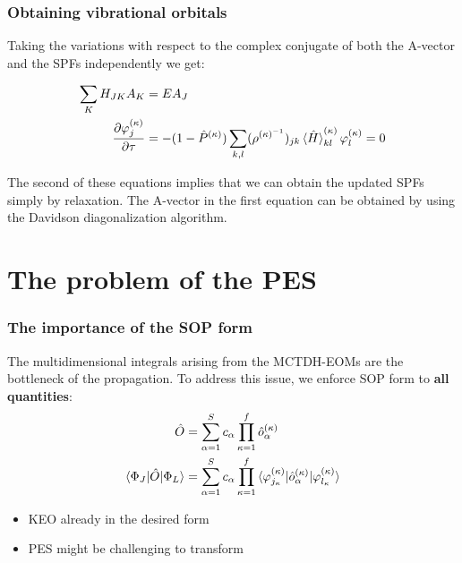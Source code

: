 \documentclass{beamer}
\begin{document}
\begin{frame}
  \frametitle{Obtaining vibrational orbitals}
  Taking the variations with respect to the complex conjugate of both the A-vector and the SPFs independently we get:
  \begin{block}{}
\begin{align}
\begin{split}
	\sum_K H_{JK}A_K &= EA_J \\
	\frac{\partial \varphi^{(\kappa)}_j}{\partial \tau} &= -(1-\hat{P}^{(\kappa)})
	\sum_{k,l}(\rho^{(\kappa)^{-1}})_{jk}\braket{\hat{H}}^{(\kappa)}_{kl}\varphi_l^{(\kappa)} = 0
	\label{mctdh_eom_ti}
\end{split}
\end{align}
\end{block}
The second of these equations implies that we can obtain the updated SPFs simply by relaxation. The A-vector in the first equation can be obtained by using the Davidson diagonalization algorithm.
  
\end{frame}

\section{The problem of the PES}\label{probpes}

\begin{frame}
  \frametitle{The importance of the SOP form}
  \vspace{-.5cm}
  The multidimensional integrals arising from the MCTDH-EOMs are the bottleneck of the propagation. To address this issue, we enforce SOP form to \textbf{all quantities}:
\begin{align}
\begin{split}
\hat{O} &= \sum_{\alpha=1}^S c_{\alpha} \prod_{\kappa=1}^f \hat{o}_{\alpha}^{(\kappa)} \\
\braket{\Phi_J|\hat{O}|\Phi_L} &= \sum_{\alpha=1}^S c_{\alpha} \prod_{\kappa=1}^f \braket{\varphi_{j_{\kappa}}^{(\kappa)}|\hat{o}_{\alpha}^{(\kappa)}|\varphi_{l_{\kappa}}^{(\kappa)}}
\end{split}
\end{align}
\begin{block}{}
  \begin{itemize}
  \item KEO already in the desired form
  \item PES might be challenging to transform
  \end{itemize}
\end{block}
\end{frame}
\end{document}
